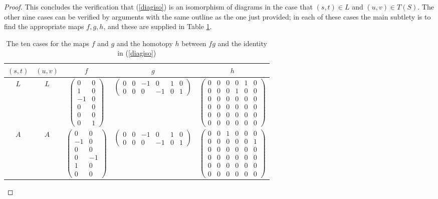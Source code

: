 \documentclass[11pt]{amsart}
\theoremstyle{definition}
\theoremstyle{remark}
\numberwithin{equation}{section}
\begin{document}
\begin{proof}
This concludes the verification that (\ref{diagiso}) is an isomorphism of diagrams in the case that $(s,t)\in L$ and $(u,v)\in T(S)$.  The other nine cases can be verified by arguments with the same outline as the one just provided; in each of these cases the main subtlety is to find the appropriate maps $f,g,h$, and these are supplied in Table \ref{bigtable}.

\begin{table}
	\caption{ \label{bigtable} The ten cases for the maps 
		$f$ and $g$ and the homotopy $h$ between $fg$ and the identity in (\ref{diagiso})}
\begin{tabular}{c|c|c|c|c} 
	$(s,t)$ & $(u,v)$ & $f$ & $g$ & $h$  \\ \hline 
	$L$ & $L$ & $\left(\begin{array}{cc} 0 & 0 \\ 1 & 0 \\ -1 & 0 \\ 0 & 0 
	\\ 0 & 0 \\ 0 & 1\end{array}\right)$ & $\left(\begin{array}{cccccc} 0 & 0 & -1 & 0 & 1 & 0 \\ 0 & 0 & 0 & -1 & 0 & 1\end{array}\right)$ & $\left(\begin{array}{cccccc} 0 & 0 & 0 & 0 & 1 & 0 \\ 0 & 0 & 0 & 1 & 0 & 0 \\ 0 & 0 & 0 & 0 & 0 & 0 \\ 0 & 0 & 0 & 0 & 0 & 0\\ 0 & 0 & 0 & 0 & 0 & 0\\ 0 & 0 & 0 & 0 & 0 & 0\end{array}\right)$ 
	\\ \hline $A$ & $A$ & $\left(\begin{array}{cc} 0 & 0 \\ -1 & 0 \\ 0 & 0 \\ 0 & -1 \\ 1 & 0 \\ 0 & 0 \end{array}\right)$  & $\left(\begin{array}{cccccc} 0 & 0 & -1 & 0 & 1 & 0 \\ 0 & 0 & 0 & -1 & 0 & 1  \end{array}\right)$ & $\left(\begin{array}{cccccc} 0 & 0 & 1 & 0 & 0 & 0 \\ 0 & 0 & 0 & 0 & 0 & 1 \\ 0 & 0 & 0 & 0 & 0 & 0  \\ 0 & 0 & 0 & 0 & 0 & 0 \\ 0 & 0 & 0 & 0 & 0 & 0 \\ 0 & 0 & 0 & 0 & 0 & 0   \end{array}\right)$ \\ \hline 

\end{tabular}
\end{table}
\end{proof}
\end{document}

